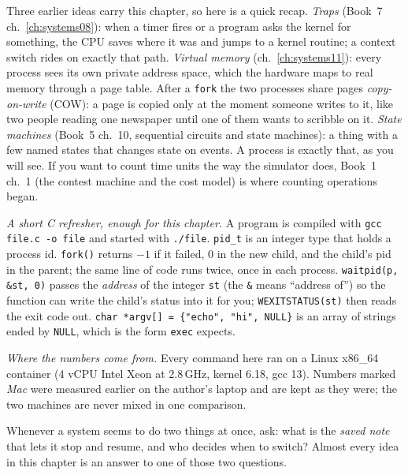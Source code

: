 \begin{rulebox}
Three earlier ideas carry this chapter, so here is a quick recap.
\emph{Traps} (Book~7 ch.~\ref{ch:systems08}): when a timer fires or a
program asks the kernel for something, the CPU saves where it was
and jumps to a kernel routine; a context switch rides on exactly
that path. \emph{Virtual memory} (ch.~\ref{ch:systems11}): every
process sees its own private address space, which the hardware maps
to real memory through a page table. After a \texttt{fork} the two
processes share pages \emph{copy-on-write} (COW): a page is copied
only at the moment someone writes to it, like two people reading one
newspaper until one of them wants to scribble on it. \emph{State
machines} (Book~5 ch.~10, sequential circuits and state machines): a
thing with a few named states that changes state on events. A process
is exactly that, as you will see. If you want to count time units the
way the simulator does, Book~1 ch.~1 (the contest machine and the
cost model) is where counting operations began.

\emph{A short C refresher, enough for this chapter.} A program is
compiled with \texttt{gcc file.c -o file} and started with
\texttt{./file}. \texttt{pid\_t} is an integer type that holds a
process id. \texttt{fork()} returns $-1$ if it failed, $0$ in the new
child, and the child's pid in the parent; the same line of code runs
twice, once in each process. \texttt{waitpid(p, \&st, 0)} passes the
\emph{address} of the integer \texttt{st} (the \texttt{\&} means
``address of'') so the function can write the child's status into it
for you; \texttt{WEXITSTATUS(st)} then reads the exit code out.
\texttt{char *argv[] = \{"echo", "hi", NULL\}} is an array of strings
ended by \texttt{NULL}, which is the form \texttt{exec} expects.

\emph{Where the numbers come from.} Every command here ran on a
Linux x86\_64 container (4 vCPU Intel Xeon at 2.8\,GHz, kernel 6.18,
gcc 13). Numbers marked \emph{Mac} were measured earlier on the
author's laptop and are kept as they were; the two machines are never
mixed in one comparison.
\end{rulebox}

\begin{principle}
Whenever a system seems to do two things at once, ask: what is the
\emph{saved note} that lets it stop and resume, and who decides when
to switch? Almost every idea in this chapter is an answer to one of
those two questions.
\end{principle}


